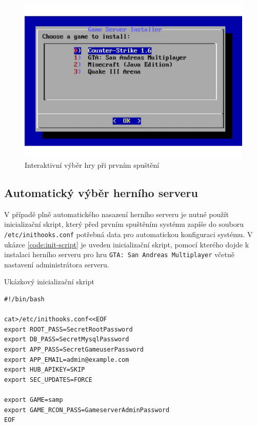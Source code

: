 \begin{figure}[h]
    \centering
    \includegraphics[width=1\linewidth]{chapters/images/game-selection.pdf}
    \caption{Interaktivní výběr hry při prvním spuštění}
    \label{fig:game-selection}
\end{figure}

\subsection{Automatický výběr herního serveru}

V případě plně automatického nasazení herního serveru je nutné použít inicializační skript, který před prvním spuštěním systému
zapíše do souboru \texttt{/etc/inithooks.conf} potřebná data pro automatickou konfiguraci systému.
V ukázce \ref{code:init-script} je uveden inicializační skript, pomocí kterého dojde k instalaci herního serveru pro hru \texttt{GTA: San Andreas Multiplayer}
včetně nastavení administrátora serveru.

\begin{listing}[h!]
    \caption{Ukázkový inicializační skript}
    \label{code:init-script}
    \begin{verbatim}
#!/bin/bash

cat>/etc/inithooks.conf<<EOF
export ROOT_PASS=SecretRootPassword
export DB_PASS=SecretMysqlPassword
export APP_PASS=SecretGameuserPassword
export APP_EMAIL=admin@example.com
export HUB_APIKEY=SKIP
export SEC_UPDATES=FORCE

export GAME=samp
export GAME_RCON_PASS=GameserverAdminPassword
EOF
    \end{verbatim}
\end{listing}

